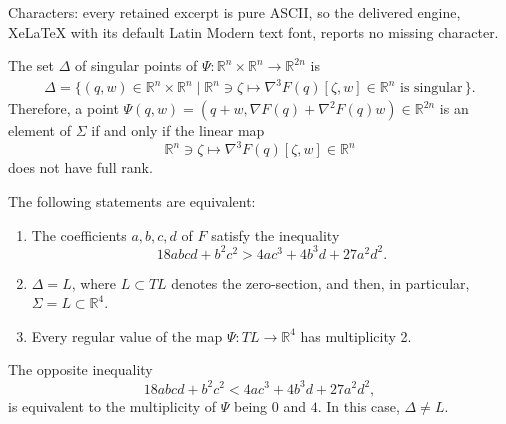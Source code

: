 \documentclass[10pt,a4paper]{amsart}
\newcommand{\R}{{\mathbb R}}
\begin{document}
Characters: every retained excerpt is pure ASCII, so the delivered engine, XeLaTeX with its default Latin Modern text font, reports no missing character.
\begin{lemma}\label{lem:description_of_wall_Lagrangian_case}
The set $\Delta$ of singular points of $\Psi:\R^n\times\R^n\to \R^{2n}$ is 
\begin{equation}\nonumber
\begin{aligned}
\Delta=\big\{(q,w)\in\R^n\times\R^n\mid\R^n\ni\zeta\mapsto \nabla^3F(q)[\zeta,w]\in\R^n\text{ is singular}\,\big\}.
\end{aligned}
\end{equation}
%
Therefore, a point $\Psi(q,w)=(q+w,\nabla F(q)+\nabla^2F(q)w)\in\R^{2n}$ is an element of $\Sigma$ if and only if the linear map
\begin{equation}\nonumber
\R^n\ni\zeta\mapsto \nabla^3F(q)[\zeta,w]\in\R^n
\end{equation}
does not have full rank. 
\end{lemma}

\begin{proposition}\label{prop:abcd_example_and_wall} 
The following statements are equivalent:
\begin{enumerate}   \renewcommand{\theenumi}{\roman{enumi}}\renewcommand{\labelenumi}{\rm (\theenumi)} %
\item The coefficients $a,b,c,d$ of $F$ satisfy the inequality 
\begin{equation}\label{eq:no_wall_condition_cubic_examples}
18abcd+b^2c^2>4ac^3+4b^3d+27a^2d^2.
\end{equation}
\item $\Delta=L$, where $L\subset TL$ denotes the zero-section, and then, in particular, $\Sigma=L\subset\R^4$.
\item Every regular value of the map $\Psi:TL\to\R^4$ has multiplicity 2.
\end{enumerate}
The opposite inequality 
\begin{equation}\label{eq:no_wall_condition_cubic_examples_other_way_round}
18abcd+b^2c^2<4ac^3+4b^3d+27a^2d^2,
\end{equation}
is equivalent to the multiplicity of $\Psi$ being $0$ and $4$. In this case, $\Delta\neq L$.
\end{proposition}
\end{document}
